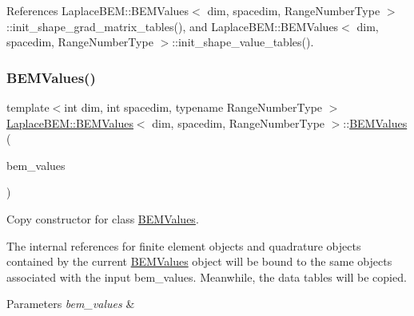 References Laplace\+B\+E\+M\+::\+B\+E\+M\+Values$<$ dim, spacedim, Range\+Number\+Type $>$\+::init\+\_\+shape\+\_\+grad\+\_\+matrix\+\_\+tables(), and Laplace\+B\+E\+M\+::\+B\+E\+M\+Values$<$ dim, spacedim, Range\+Number\+Type $>$\+::init\+\_\+shape\+\_\+value\+\_\+tables().

\mbox{\label{classLaplaceBEM_1_1BEMValues_ac40a849631e782f840a927e68bc2f9f6}} 
\subsubsection{\texorpdfstring{B\+E\+M\+Values()}{BEMValues()}\hspace{0.1cm}{\footnotesize\ttfamily [2/4]}}
{\footnotesize\ttfamily template$<$int dim, int spacedim, typename Range\+Number\+Type $>$ \\
\hyperlink{classLaplaceBEM_1_1BEMValues}{Laplace\+B\+E\+M\+::\+B\+E\+M\+Values}$<$ dim, spacedim, Range\+Number\+Type $>$\+::\hyperlink{classLaplaceBEM_1_1BEMValues}{B\+E\+M\+Values} (\begin{DoxyParamCaption}\item[{const \hyperlink{classLaplaceBEM_1_1BEMValues}{B\+E\+M\+Values}$<$ dim, spacedim, Range\+Number\+Type $>$ \&}]{bem\+\_\+values }\end{DoxyParamCaption})}

Copy constructor for class {\ttfamily \hyperlink{classLaplaceBEM_1_1BEMValues}{B\+E\+M\+Values}}.


\begin{DoxyDescription}
\item[Note ]The internal references for finite element objects and quadrature objects contained by the current {\ttfamily \hyperlink{classLaplaceBEM_1_1BEMValues}{B\+E\+M\+Values}} object will be bound to the same objects associated with the input {\ttfamily bem\+\_\+values}. Meanwhile, the data tables will be copied. 
\end{DoxyDescription}


\begin{DoxyParams}{Parameters}
{\em bem\+\_\+values} & \\
\hline
\end{DoxyParams}


